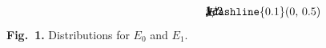 \unitlength=20mm
$$
\begin{picture}(2,1)(0,0)
\thicklines
  \put(-0.05,0){\line(1,0){2.15}}
  \put(0,-0.05){\line(0,1){1.15}}
  \put(1, -0.5){$E'$}
  \put(-0.45, 0.8){$p$}
  \put (-0.05, 0.97){\line(1,0){1.05}}
  \put (-0.2, 1){$1$}
  \put (-0.05, 0.5){\line(1,0){0.05}}
  \put (-0.4, 0.47){$1/2$}
  \dashline{0.1}(0, 0.5)  (2, 0.5)
  \put (1,-0.05){\line(0,1){1.05}}
  \put (1, -0.2){$1$}
  \put (2,-0.05){\line(0,1){0.55}}
  \put (2, -0.2){$2$}
  \put (0.6, 1.1){$p_0$}
  \put (1.6, 0.6){$p_1$}
\end{picture}
$$
\vglue 40pt
\centerline{{\bf Fig.~1.}  Distributions for $E_0$ and $E_1$.}
